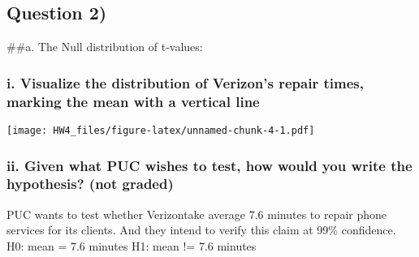 \documentclass[
]{article}
\newenvironment{Shaded}{\begin{snugshade}}{\end{snugshade}}
\newcommand{\AttributeTok}[1]{\textcolor[rgb]{0.77,0.63,0.00}{#1}}
\newcommand{\DecValTok}[1]{\textcolor[rgb]{0.00,0.00,0.81}{#1}}
\newcommand{\FunctionTok}[1]{\textcolor[rgb]{0.00,0.00,0.00}{#1}}
\newcommand{\NormalTok}[1]{#1}
\newcommand{\OtherTok}[1]{\textcolor[rgb]{0.56,0.35,0.01}{#1}}
\newcommand{\SpecialCharTok}[1]{\textcolor[rgb]{0.00,0.00,0.00}{#1}}
\newcommand{\StringTok}[1]{\textcolor[rgb]{0.31,0.60,0.02}{#1}}
\begin{document}
\hypertarget{question-2}{%
\subsection{Question 2)}\label{question-2}}

\#\#a. The Null distribution of t-values:

\hypertarget{i.-visualize-the-distribution-of-verizons-repair-times-marking-the-mean-with-a-vertical-line}{%
\subsubsection{i. Visualize the distribution of Verizon's repair times,
marking the mean with a vertical
line}\label{i.-visualize-the-distribution-of-verizons-repair-times-marking-the-mean-with-a-vertical-line}}

\begin{Shaded}
\end{Shaded}

\texttt{[image: HW4\_files/figure-latex/unnamed-chunk-4-1.pdf]}

\hypertarget{ii.-given-what-puc-wishes-to-test-how-would-you-write-the-hypothesis-not-graded}{%
\subsubsection{ii. Given what PUC wishes to test, how would you write
the hypothesis? (not
graded)}\label{ii.-given-what-puc-wishes-to-test-how-would-you-write-the-hypothesis-not-graded}}

PUC wants to test whether Verizontake average 7.6 minutes to repair
phone services for its clients. And they intend to verify this claim at
99\% confidence. H0: mean = 7.6 minutes H1: mean != 7.6 minutes
\end{document}
